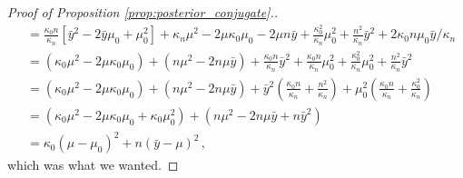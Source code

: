 \begin{proof}[Proof of Proposition \ref{prop:posterior_conjugate}.]
\begin{align*}
&=\frac{\kappa_0 n}{\kappa_n}\left[\bar{y}^2 - 2\bar{y}\mu_0 + \mu_0^2 \right] + \kappa_n \mu^2 - 2\mu \kappa_0 \mu_0 - 2\mu n\bar{y} + \frac{\kappa_0^2}{\kappa_n}\mu_0^2 + \frac{n^2}{\kappa_n} \bar{y}^2 + 2 \kappa_0 n \mu_0 \bar{y} / \kappa_n\\
&= \left(\kappa_0 \mu^2 -2\mu \kappa_0 \mu_0 \right) + \left(n \mu^2 - 2 n \mu \bar{y} \right) + \frac{\kappa_0 n}{\kappa_n}\bar{y}^2 + \frac{\kappa_0 n}{\kappa_n}\mu_0^2 + \frac{\kappa_0^2}{\kappa_n} \mu_0^2 + \frac{n^2}{\kappa_n} \bar{y}^2\\
&= \left(\kappa_0 \mu^2 -2\mu \kappa_0 \mu_0 \right) + \left(n \mu^2 - 2 n \mu \bar{y} \right) + \bar{y}^2 \left(\frac{\kappa_0 n}{\kappa_n} + \frac{n^2}{\kappa_n}\right) + \mu_0^2\left(\frac{\kappa_0 n}{\kappa_n} + \frac{\kappa_0^2}{\kappa_n}\right)\\
&= \left(\kappa_0 \mu^2 -2\mu \kappa_0 \mu_0 + \kappa_0 \mu_0^2 \right) + \left(n \mu^2 - 2 n \mu \bar{y} + n \bar{y}^2\right)\\
&=\kappa_0(\mu - \mu_0)^2 + n(\bar{y} - \mu)^2 \,,
\end{align*}
which was what we wanted.
\end{proof}

